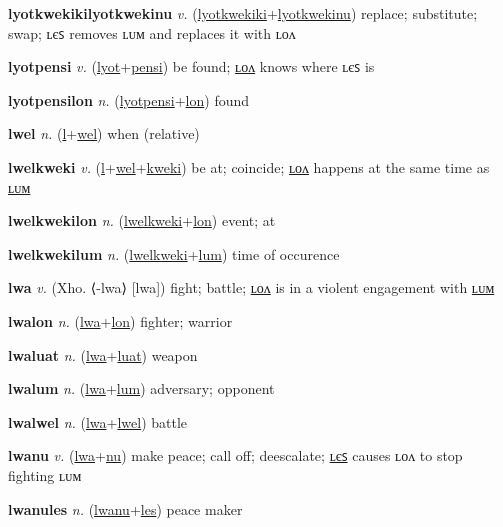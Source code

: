 \textbf{\hypertarget{lyotkwekikilyotkwekinu}{lyotkwekikilyotkwekinu}} \textit{v.} (\hyperlink{lyotkwekiki}{lyotkwekiki}+\allowbreak \hyperlink{lyotkwekinu}{lyotkwekinu})
replace; substitute; swap; ʟєꜱ removes ʟᴜᴍ and replaces it with ʟᴏᴧ

\textbf{\hypertarget{lyotpensi}{lyotpensi}} \textit{v.} (\hyperlink{lyot}{lyot}+\allowbreak \hyperlink{pensi}{pensi})
be found; \hyperlink{lyotpensilon}{ʟᴏᴧ} knows where ʟєꜱ is

\textbf{\hypertarget{lyotpensilon}{lyotpensilon}} \textit{n.} (\hyperlink{lyotpensi}{lyotpensi}+\allowbreak \hyperlink{lon}{lon})
found

\textbf{\hypertarget{lwel}{lwel}} \textit{n.} (\hyperlink{l}{l}+\allowbreak \hyperlink{wel}{wel})
when (relative)

\textbf{\hypertarget{lwelkweki}{lwelkweki}} \textit{v.} (\hyperlink{l}{l}+\allowbreak \hyperlink{wel}{wel}+\allowbreak \hyperlink{kweki}{kweki})
be at; coincide; \hyperlink{lwelkwekilon}{ʟᴏᴧ} happens at the same time as \hyperlink{lwelkwekilum}{ʟᴜᴍ}

\textbf{\hypertarget{lwelkwekilon}{lwelkwekilon}} \textit{n.} (\hyperlink{lwelkweki}{lwelkweki}+\allowbreak \hyperlink{lon}{lon})
event; at

\textbf{\hypertarget{lwelkwekilum}{lwelkwekilum}} \textit{n.} (\hyperlink{lwelkweki}{lwelkweki}+\allowbreak \hyperlink{lum}{lum})
time of occurence

\textbf{\hypertarget{lwa}{lwa}} \textit{v.} (Xho. ⟨-lwa⟩ [lwa])
fight; battle; \hyperlink{lwalon}{ʟᴏᴧ} is in a violent engagement with \hyperlink{lwalum}{ʟᴜᴍ}

\textbf{\hypertarget{lwalon}{lwalon}} \textit{n.} (\hyperlink{lwa}{lwa}+\allowbreak \hyperlink{lon}{lon})
fighter; warrior

\textbf{\hypertarget{lwaluat}{lwaluat}} \textit{n.} (\hyperlink{lwa}{lwa}+\allowbreak \hyperlink{luat}{luat})
weapon

\textbf{\hypertarget{lwalum}{lwalum}} \textit{n.} (\hyperlink{lwa}{lwa}+\allowbreak \hyperlink{lum}{lum})
adversary; opponent

\textbf{\hypertarget{lwalwel}{lwalwel}} \textit{n.} (\hyperlink{lwa}{lwa}+\allowbreak \hyperlink{lwel}{lwel})
battle

\textbf{\hypertarget{lwanu}{lwanu}} \textit{v.} (\hyperlink{lwa}{lwa}+\allowbreak \hyperlink{nu}{nu})
make peace; call off; deescalate; \hyperlink{lwanules}{ʟєꜱ} causes ʟᴏᴧ to stop fighting ʟᴜᴍ

\textbf{\hypertarget{lwanules}{lwanules}} \textit{n.} (\hyperlink{lwanu}{lwanu}+\allowbreak \hyperlink{les}{les})
peace maker

